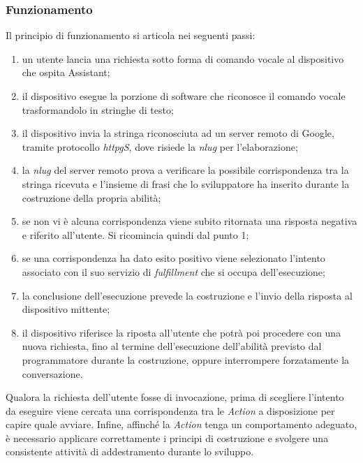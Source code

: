 		\subsubsection{Funzionamento}
		Il principio di funzionamento si articola nei seguenti passi:
		\begin{enumerate}
			\item un utente lancia una richiesta sotto forma di comando vocale al dispositivo che ospita Assistant;
			\item il dispositivo esegue la porzione di software che riconosce il comando vocale trasformandolo in stringhe di testo;
			\item il dispositivo invia la stringa riconosciuta ad un server remoto di Google, tramite protocollo \emph{\gls{httpg}S}\glsfirstoccur, dove risiede la \emph{\gls{nlug}} per l'elaborazione;
			\item la \emph{\gls{nlug}} del server remoto prova a verificare la possibile corrispondenza tra la stringa ricevuta e l'insieme di frasi che lo sviluppatore ha inserito durante la costruzione della propria abilità;
			\item se non vi è alcuna corrispondenza viene subito ritornata una risposta negativa e riferito all'utente. Si ricomincia quindi dal punto 1;
			\item se una corrispondenza ha dato esito positivo viene selezionato l'intento associato con il suo servizio di \emph{fulfillment} che si occupa dell'esecuzione;
			\item la conclusione dell'esecuzione prevede la costruzione e l'invio della risposta al dispositivo mittente;
			\item il dispositivo riferisce la riposta all'utente che potrà poi procedere con una nuova richiesta, fino al termine dell'esecuzione dell'abilità previsto dal programmatore durante la costruzione, oppure interrompere forzatamente la conversazione.
		\end{enumerate}
		Qualora la richiesta dell'utente fosse di invocazione, prima di scegliere l'intento da eseguire viene cercata una corrispondenza tra le \emph{Action} a disposizione per capire quale avviare.
		Infine, affinché la \emph{Action} tenga un comportamento adeguato, è necessario applicare correttamente i principi di costruzione e svolgere una consistente attività di addestramento durante lo sviluppo.
